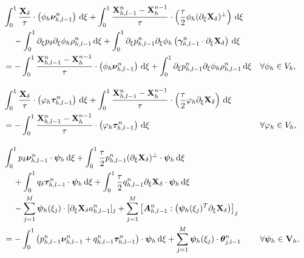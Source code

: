 \documentclass[review]{elsarticle}
\begin{document}
\begin{subequations}\label{eq:newton_linear}
\begin{align}
& \int_0^1\dfrac{\mathbf{X}_\delta}{\tau}\cdot\left(\phi_h\boldsymbol\nu_{h,l-1}^n\right)\,\mathrm{d}\xi + \int_0^1\dfrac{\mathbf{X}_{h,l-1}^n -
                 \mathbf{X}_h^{n-1}}{\tau}\cdot\left(\dfrac{\tau}{2}\phi_h(\partial_\xi\mathbf{X}_\delta)^\perp\right)\,\mathrm{d}\xi  \\
&\quad\, - \int_0^1 \partial_\xi p_\delta \partial_\xi\phi_h \rho_{h,l-1}^n\,\mathrm{d}\xi
 + \int_0^1\partial_\xi p_{h,l-1}^n\partial_\xi\phi_h\left(\boldsymbol\gamma_{h,l-1}^n\cdot
                 \partial_\xi\mathbf{X}_\delta\right)\,\mathrm{d}\xi \nonumber \\
& = -\int_0^1\dfrac{\mathbf{X}_{h,l-1}^n - \mathbf{X}_h^{n-1}}{\tau}\cdot \left(\phi_h \boldsymbol\nu_{h,l-1}^n\right) \,
                 \mathrm{d}\xi + \int_0^1\partial_\xi p_{h,l-1}^n \partial_\xi\phi_h\rho_{h,l-1}^n\, \mathrm{d}\xi
                 &&
                 \forall \phi_h\in V_h, \nonumber\\[10pt]
& \int_0^1\dfrac{\mathbf{X}_\delta}{\tau}\cdot\left(\varphi_h\boldsymbol\tau_{h,l-1}^n\right)\,\mathrm{d}\xi +
               \int_0^1\dfrac{\mathbf{X}_{h,l-1}^n - \mathbf{X}_h^{n-1}}{\tau}\cdot\left(\dfrac{\tau}{2}\varphi_h\partial_\xi\mathbf{X}_\delta\right)\,\mathrm{d}\xi  \\
& = - \int_0^1\dfrac{\mathbf{X}_{h,l-1}^n - \mathbf{X}_h^{n - 1}}{\tau}\cdot
               \left(\varphi_h\boldsymbol\tau_{h,l-1}^n\right)\,\mathrm{d}\xi
               &&\forall \varphi_h\in V_h, \nonumber \\[10pt]
& \int_0^1p_\delta\boldsymbol\nu_{h,l-1}^n\cdot\boldsymbol\psi_h\,\mathrm{d}\xi +
               \int_0^1\dfrac{\tau}{2} p_{h,l-1}^n(\partial_\xi\mathbf{X}_\delta)^\perp\cdot\boldsymbol\psi_h\,\mathrm{d}\xi \\
&\quad\,
+ \int_0^1q_\delta\boldsymbol\tau_{h,l-1}^n\cdot\boldsymbol\psi_h \,\mathrm{d}\xi + \int_0^1 \dfrac{\tau}{2} q_{h,l-1}^n\partial_\xi\mathbf{X}_\delta\cdot\boldsymbol\psi_h\,\mathrm{d}\xi \nonumber \\
&\quad\, - \sum_{j = 1}^M\boldsymbol\psi_h(\xi_j)\cdot [\partial_\xi\mathbf{X}_\delta a_{h,l-1}^n]_j + \sum_{j = 1}^M \left[\bm{A}_{h,l-1}^n:\left(\boldsymbol\psi_h(\xi_j)^T\partial_\xi\mathbf{X}_\delta\right)\right]_j \nonumber \\
& = - \int_0^1\left(p_{h,l-1}^n\boldsymbol\nu_{h,l-1}^n + q_{h,l-1}^n
                \boldsymbol\tau_{h,l-1}^n\right)\cdot\boldsymbol\psi_h\,\mathrm{d}\xi + \sum_{j = 1}^{M}\boldsymbol\psi_h(\xi_j)\cdot\boldsymbol\theta_{j, l-1}^n && \forall \boldsymbol\psi_h\in {\bf V}_h.
\nonumber
\end{align}
\end{subequations}
\end{document}
